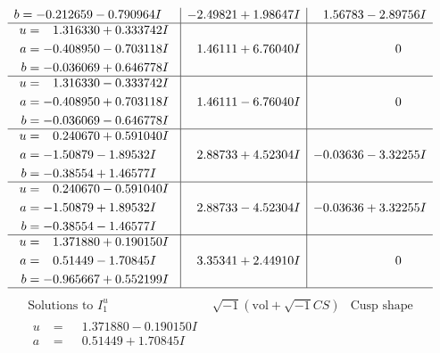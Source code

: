 \documentclass[1p]{elsarticle_modified}
\theoremstyle{definition}
\newcommand{\I}{\sqrt{-1}}
\begin{document}
$$\begin{array}{c|c|c}
\begin{aligned}
b &= -0.212659 - 0.790964 I\end{aligned}
 & -2.49821 + 1.98647 I & \phantom{-}1.56783 - 2.89756 I \\ \hline\begin{aligned}
u &= \phantom{-}1.316330 + 0.333742 I \\
a &= -0.408950 - 0.703118 I \\
b &= -0.036069 + 0.646778 I\end{aligned}
 & \phantom{-}1.46111 + 6.76040 I & \phantom{-0.000000 } 0 \\ \hline\begin{aligned}
u &= \phantom{-}1.316330 - 0.333742 I \\
a &= -0.408950 + 0.703118 I \\
b &= -0.036069 - 0.646778 I\end{aligned}
 & \phantom{-}1.46111 - 6.76040 I & \phantom{-0.000000 } 0 \\ \hline\begin{aligned}
u &= \phantom{-}0.240670 + 0.591040 I \\
a &= -1.50879 - 1.89532 I \\
b &= -0.38554 + 1.46577 I\end{aligned}
 & \phantom{-}2.88733 + 4.52304 I & -0.03636 - 3.32255 I \\ \hline\begin{aligned}
u &= \phantom{-}0.240670 - 0.591040 I \\
a &= -1.50879 + 1.89532 I \\
b &= -0.38554 - 1.46577 I\end{aligned}
 & \phantom{-}2.88733 - 4.52304 I & -0.03636 + 3.32255 I \\ \hline\begin{aligned}
u &= \phantom{-}1.371880 + 0.190150 I \\
a &= \phantom{-}0.51449 - 1.70845 I \\
b &= -0.965667 + 0.552199 I\end{aligned}
 & \phantom{-}3.35341 + 2.44910 I & \phantom{-0.000000 } 0\\
 \hline 
 \end{array}$$\newpage$$\begin{array}{c|c|c}  
\text{Solutions to }I^u_{1}& \I (\text{vol} + \sqrt{-1}CS) & \text{Cusp shape}\\
 \hline 
\begin{aligned}
u &= \phantom{-}1.371880 - 0.190150 I \\
a &= \phantom{-}0.51449 + 1.70845 I \\

\end{aligned}
\end{array}$$
\end{document}

